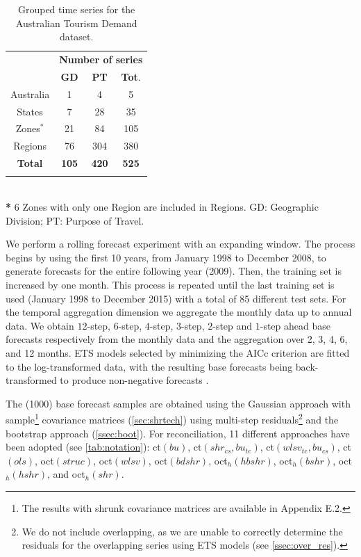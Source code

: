 \documentclass[a4paper,11pt]{article}
\theoremstyle{definition}
\begin{document}
\begin{table}[!t]
	\setlength{\tabcolsep}{10pt}
	\centering
	\begin{tabular}{c|cc|c}
		\toprule
		& \multicolumn{3}{c}{\textbf{Number of series}}\\
		& \textbf{GD} & \textbf{PT} & \textbf{Tot}. \\
		\midrule
		Australia & 1 & 4 & 5 \\
		States & 7 & 28 & 35 \\
		Zones$^*$ & 21 & 84 & 105 \\
		Regions & 76 & 304 & 380 \\
		\bottomrule
		\textbf{Total} & \textbf{105}                                  & \textbf{420}   & \textbf{525} \\
		\bottomrule
		\addlinespace[0.3em]
	\end{tabular}\\
	{\footnotesize \textbf{*} 6 Zones with only one Region are included in Regions. GD: Geographic Division; PT: Purpose of Travel.}\\[0.1cm]
	\caption{\label{tab:nseries} Grouped time series for the Australian Tourism Demand dataset. }
\end{table}

We perform a rolling forecast experiment with an expanding window. The process begins by using the first 10 years, from January 1998 to December 2008, to generate forecasts for the entire following year (2009). Then, the training set is increased by one month. This process is repeated until the last training set is used (January 1998 to December 2015) with a total of 85 different test sets. For the temporal aggregation dimension we aggregate the monthly data up to annual data. We obtain $12$-step, $6$-step, $4$-step, $3$-step, $2$-step and $1$-step ahead base forecasts respectively from the monthly data and the aggregation over 2, 3, 4, 6, and 12 months. ETS models selected by minimizing the AICc criterion \citep{Rforecast} %
are fitted to the log-transformed data, with the resulting base forecasts being back-transformed to produce non-negative forecasts \citep{wickramasuriya2020}.

The (1000) base forecast samples are obtained using the Gaussian approach with sample\footnote{The results with shrunk covariance matrices are available in Appendix E.2.} covariance matrices (\autoref{sec:shrtech}) using multi-step residuals\footnote{We do not include overlapping, as we are unable to correctly determine the residuals for the overlapping series using ETS models (see \autoref{ssec:over_res}).} and the bootstrap approach (\autoref{ssec:boot}). For reconciliation, 11 different approaches have been adopted (see \autoref{tab:notation}): ct$(bu)$, ct$(shr_{cs}, bu_{te})$, ct$(wlsv_{te}, bu_{cs})$, ct$(ols)$, oct$(struc)$, oct$(wlsv)$, oct$(bdshr)$, oct$_h(hbshr)$, oct$_h(bshr)$, oct$_h(hshr)$, and oct$_h(shr)$.
\end{document}
